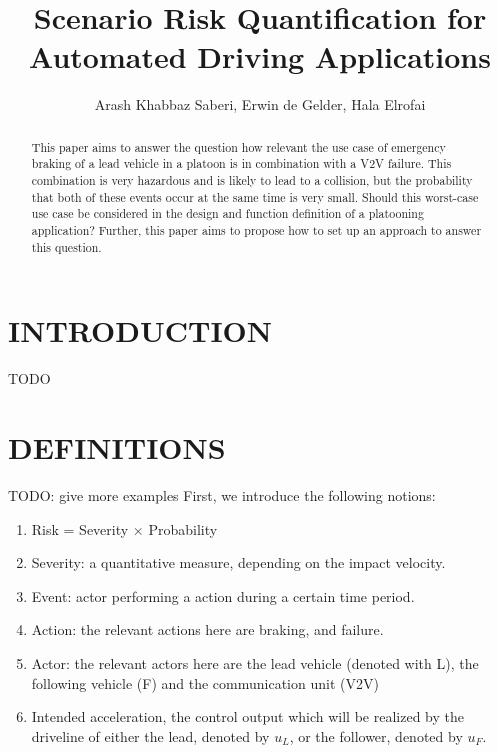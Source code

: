 \documentclass[letterpaper, 10 pt, conference]{ieeeconf}  %
\title{\LARGE \bf
Scenario Risk Quantification for Automated Driving Applications
}
\author{Arash Khabbaz Saberi, Erwin de Gelder, Hala Elrofai}
\begin{document}
\maketitle
\thispagestyle{empty}
\pagestyle{empty}


\begin{abstract}
This paper aims to answer the question how relevant the use case of emergency braking of a lead vehicle in a platoon is in combination with a V2V failure. This combination is very hazardous and is likely to lead to a collision, but the probability that both of these events occur at the same time is very small. Should this worst-case use case be considered in the design and function definition of a platooning application? Further, this paper aims to propose how to set up an approach to answer this question.
\end{abstract}


\section{INTRODUCTION}
TODO

\section{DEFINITIONS} %

TODO: give more examples
First, we introduce the following notions:
\begin{enumerate}
\item{Risk = Severity $\times$ Probability  }
\item{Severity: a quantitative measure, depending on the impact velocity.}
\item{Event: actor performing a action during a certain time period.}
\item{Action: the relevant actions here are braking, and failure.  }
\item{Actor: the relevant actors here are the lead vehicle (denoted with L), the following vehicle (F) and the communication unit (V2V)}
\item{Intended acceleration,  the control output which will be realized by the driveline of either the lead, denoted by $u_L$, or the follower, denoted by $u_F$.}
\end{enumerate}
\end{document}
